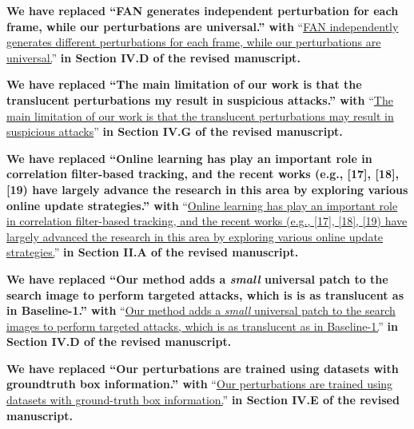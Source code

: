 \documentclass[12pt]{article}
\begin{document}
\textbf{We have replaced ``FAN generates independent perturbation for each frame, while our perturbations are universal.'' with} ``\uline{FAN independently generates different perturbations for each frame, while our perturbations are universal.}'' \textbf{in Section IV.D of the revised manuscript.}

\textbf{We have replaced ``The main limitation of our work is that the translucent perturbations my result in suspicious attacks.'' with} ``\uline{The main limitation of our work is that the translucent perturbations may result in suspicious attacks}'' \textbf{in Section IV.G of the revised manuscript.}

\textbf{We have replaced ``Online learning has play an important role in correlation filter-based tracking, and the recent works (e.g., [17], [18], [19) have largely advance the research in this area by exploring various online update strategies.'' with} ``\uline{Online learning has play an important role in correlation filter-based tracking, and the recent works (e.g., [17], [18], [19) have largely advanced the research in this area by exploring various online update strategies.}'' \textbf{in Section II.A of the revised manuscript.}

\textbf{We have replaced ``Our method adds a \textit{small} universal patch to the search image to perform targeted attacks, which is is as translucent as in Baseline-1.'' with} ``\uline{Our method adds a \textit{small} universal patch to the search images to perform targeted attacks, which is as translucent as in Baseline-1.}'' \textbf{in Section IV.D of the revised manuscript.}

\textbf{We have replaced ``Our perturbations are trained using datasets with groundtruth box information.'' with} ``\uline{Our perturbations are trained using datasets with ground-truth box information.}'' \textbf{in Section IV.E of the revised manuscript.}
\end{document}
